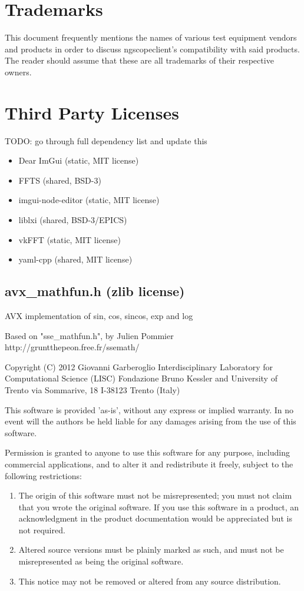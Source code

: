 \section{Trademarks}

This document frequently mentions the names of various test equipment vendors and products in order to discuss
ngscopeclient's compatibility with said products. The reader should assume that these are all trademarks of their
respective owners.

\section{Third Party Licenses}

TODO: go through full dependency list and update this
\begin{itemize}
\item Dear ImGui (static, MIT license)
\item FFTS (shared, BSD-3)
\item imgui-node-editor (static, MIT license)
\item liblxi (shared, BSD-3/EPICS)
\item vkFFT (static, MIT license)
\item yaml-cpp (shared, MIT license)
\end{itemize}

\subsection{avx\_mathfun.h (zlib license)}

AVX implementation of sin, cos, sincos, exp and log

Based on "sse\_mathfun.h", by Julien Pommier
http://gruntthepeon.free.fr/ssemath/

Copyright (C) 2012 Giovanni Garberoglio
Interdisciplinary Laboratory for Computational Science (LISC)
Fondazione Bruno Kessler and University of Trento
via Sommarive, 18
I-38123 Trento (Italy)

This software is provided 'as-is', without any express or implied
warranty.  In no event will the authors be held liable for any damages
arising from the use of this software.

Permission is granted to anyone to use this software for any purpose,
including commercial applications, and to alter it and redistribute it
freely, subject to the following restrictions:

\begin{enumerate}
\item The origin of this software must not be misrepresented; you must not
claim that you wrote the original software. If you use this software
in a product, an acknowledgment in the product documentation would be
appreciated but is not required.
\item Altered source versions must be plainly marked as such, and must not be
misrepresented as being the original software.
\item This notice may not be removed or altered from any source distribution.
\end{enumerate}
